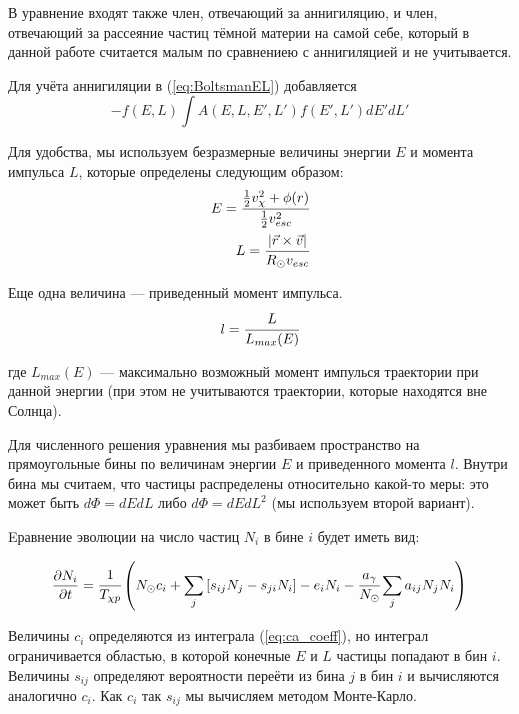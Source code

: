 \documentclass[a4paper, 14pt]{article}
\newcommand{\deriv}[2]{\frac{\partial #1}{\partial #2}}
\begin{document}
В уравнение входят также член, отвечающий за аннигиляцию, и член, отвечающий за рассеяние частиц тёмной материи на самой себе, который в данной работе считается малым по сравнениею с аннигиляцией и не учитывается.

Для учёта аннигиляции в (\ref{eq:BoltsmanEL}) добавляется 
\begin{equation}
	-\label{eq:BoltsmanAnn}
	f(E,L) \int{ A(E,L,E',L') f(E',L') dE'dL' }
\end{equation}

Для удобства, мы используем безразмерные величины энергии $E$ и момента импульса $L$, которые определены следующим образом:
\begin{equation}
	\begin{split}
		E = \cfrac{\frac{1}{2} v_{\chi}^2 + \phi(r)}
		{\frac{1}{2} v_{esc}^2} \\
		L = \cfrac{|\vec{r} \times \vec{v}|}
		{R_{\odot} v_{esc}}
	\end{split}
	\label{eq:dimentionless}
\end{equation}

Еще одна величина --- приведенный момент импульса.
\begin{equation}
	l = \cfrac{L}{L_{max}(E)}
\end{equation}

где $L_{max}(E)$ --- максимально возможный момент импулься траектории при данной энергии (при этом не учитываются траектории, которые находятся вне Солнца).



Для численного решения уравнения мы разбиваем пространство на прямоугольные бины по величинам энергии $E$ и приведенного момента $l$. Внутри бина мы считаем, что частицы распределены относительно какой-то меры: это может быть $d\Phi = dEdL$ либо $d\Phi = dEdL^2$ (мы используем второй вариант). 

Eравнение эволюции на число частиц $N_{i}$ в бине $i$ будет иметь вид:

\begin{equation}
	\label{eq:evolution}
	\deriv{N_{i}}{t} = \cfrac{1}{T_{\chi p}} \left(N_{\odot} c_i +
	\sum_j{[s_{ij} N_{j} - s_{ji} N_{i} ]} - e_{i} N_i - \cfrac{a_{\gamma}}{N_{\odot}} \sum_j {a_{ij} N_j N_i} \right)
\end{equation}

Величины $c_i$ определяются из интеграла (\ref{eq:ca_coeff}), но интеграл ограничивается областью, в которой конечные $E$ и $L$ частицы попадают в бин $i$.
Величины $s_{ij}$ определяют вероятности переёти из бина $j$ в бин $i$ и вычисляются аналогично $c_{i}$. Как $c_{i}$ так  $s_{ij}$ мы вычисляем методом Монте-Карло.
\end{document}
